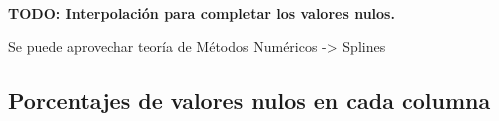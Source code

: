 \documentclass[11pt]{article}
\begin{document}
    \begin{center}
    \end{center}
    { \hspace*{\fill} \\}
    
    \textbf{TODO: Interpolación para completar los valores nulos.}

Se puede aprovechar teoría de Métodos Numéricos -\textgreater{} Splines

    \hypertarget{porcentajes-de-valores-nulos-en-cada-columna}{%
\subsection{Porcentajes de valores nulos en cada
columna}\label{porcentajes-de-valores-nulos-en-cada-columna}}
\end{document}
